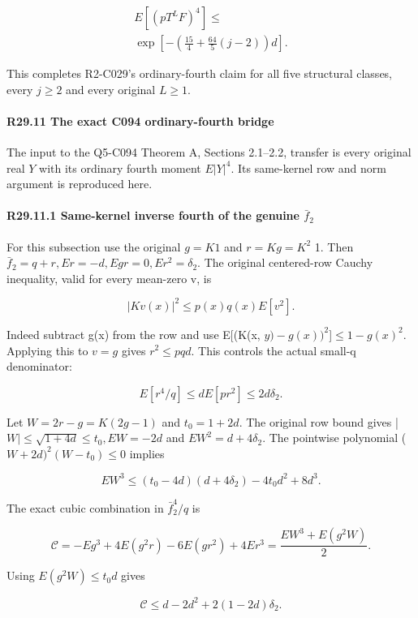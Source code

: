 \[
\begin{gathered}
E[(pT^LF)^4]\le\\
\exp\left[-\left(\frac{15}{4}+\frac{64}{5}(j-2)\right)d\right].
\end{gathered}\tag{R29.7.4}
\]

This completes R2-C029's ordinary-fourth claim for all five structural
classes, every \(j\ge 2\) and every original \(L\ge 1.\)


\paragraph{R29.11 The exact C094 ordinary-fourth bridge}\label{part:R29.11}

The input to the Q5-C094 Theorem A, Sections 2.1--2.2, transfer is every original real $Y$ with its ordinary fourth moment $E|Y|^4$. Its same-kernel row and norm argument is reproduced here.

\paragraph{R29.11.1 Same-kernel inverse fourth of the genuine \(\bar f_2\)}

For this subsection use the original \(g=K1\) and \(r=Kg=K^2\) 1.
Then \(\bar f_2=q+r,\allowbreak  Er=-d,\allowbreak  Egr=0,\allowbreak  Er^2=\delta_2.\) The original centered-row
Cauchy inequality, valid for every mean-zero v, is

\[
|Kv(x)|^2\le p(x)q(x)E[v^2].
\tag{R29.11.1}
\]

Indeed subtract g(x) from the row and use
E[(K(x, \(y)-g(x))^2\)]\ensuremath{\le}\(1-g(x)^2.\) Applying this to \(v=g\) gives
\(r^2\le pqd.\) This controls the actual small-q denominator:

\[
E[r^4/q]\le dE[pr^2]\le2d\delta_2.
\tag{R29.11.2}
\]

Let \(W=2r-g=K(2g-1)\) and \(t_0=1+2d.\) The original row bound gives
|\(W|\le \sqrt{1+4d}\le t_0,\allowbreak  EW=-2d\) and \(EW^2=d+4\delta_2.\) The pointwise
polynomial (\(W+2d)^2(W-t_0)\le 0\) implies

\[
EW^3\le(t_0-4d)(d+4\delta_2)-4t_0d^2+8d^3.
\]

The exact cubic combination in \(\bar f_2^4/q\) is

\[
\mathcal C=-Eg^3+4E(g^2r)-6E(gr^2)+4Er^3
=\frac{EW^3+E(g^2W)}2.
\]

Using \(E(g^2W)\le t_0d\) gives

\[
\mathcal C\le d-2d^2+2(1-2d)\delta_2.
\]

